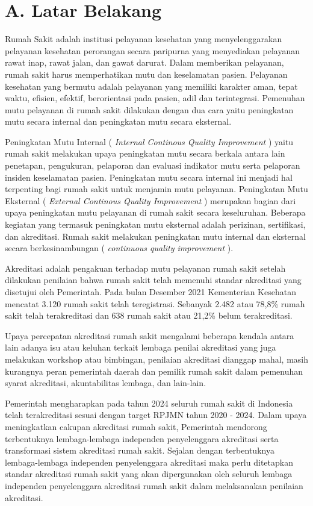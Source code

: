 \documentclass[
]{book}
\begin{document}
\hypertarget{a.-latar-belakang}{%
\section*{A. Latar Belakang}\label{a.-latar-belakang}}

Rumah Sakit adalah institusi pelayanan kesehatan yang menyelenggarakan pelayanan kesehatan perorangan secara paripurna yang menyediakan pelayanan rawat inap, rawat jalan, dan gawat darurat. Dalam memberikan pelayanan, rumah sakit harus memperhatikan mutu dan keselamatan pasien. Pelayanan kesehatan yang bermutu adalah pelayanan yang memiliki karakter aman, tepat waktu, efisien, efektif, berorientasi pada pasien, adil dan terintegrasi. Pemenuhan mutu pelayanan di rumah sakit dilakukan dengan dua cara yaitu peningkatan mutu secara internal dan peningkatan mutu secara eksternal.

Peningkatan Mutu Internal ( \emph{Internal Continous Quality Improvement} ) yaitu rumah sakit melakukan upaya peningkatan mutu secara berkala antara lain penetapan, pengukuran, pelaporan dan evaluasi indikator mutu serta pelaporan insiden keselamatan pasien. Peningkatan mutu secara internal ini menjadi hal terpenting bagi rumah sakit untuk menjamin mutu pelayanan. Peningkatan Mutu Eksternal ( \emph{External Continous Quality Improvement} ) merupakan bagian dari upaya peningkatan mutu pelayanan di rumah sakit secara keseluruhan. Beberapa kegiatan yang termasuk peningkatan mutu eksternal adalah perizinan, sertifikasi, dan akreditasi. Rumah sakit melakukan peningkatan mutu internal dan eksternal secara berkesinambungan ( \emph{continuous quality improvement} ).

Akreditasi adalah pengakuan terhadap mutu pelayanan rumah sakit setelah dilakukan penilaian bahwa rumah sakit telah memenuhi standar akreditasi yang disetujui oleh Pemerintah. Pada bulan Desember 2021 Kementerian Kesehatan mencatat 3.120 rumah sakit telah teregistrasi. Sebanyak 2.482 atau 78,8\% rumah sakit telah terakreditasi dan 638 rumah sakit atau 21,2\% belum terakreditasi.

Upaya percepatan akreditasi rumah sakit mengalami beberapa kendala antara lain adanya isu atau keluhan terkait lembaga penilai akreditasi yang juga melakukan workshop atau bimbingan, penilaian akreditasi dianggap mahal, masih kurangnya peran pemerintah daerah dan pemilik rumah sakit dalam pemenuhan syarat akreditasi, akuntabilitas lembaga, dan lain-lain.

Pemerintah mengharapkan pada tahun 2024 seluruh rumah sakit di Indonesia telah terakreditasi sesuai dengan target RPJMN tahun 2020 - 2024. Dalam upaya meningkatkan cakupan akreditasi rumah sakit, Pemerintah mendorong terbentuknya lembaga-lembaga independen penyelenggara akreditasi serta transformasi sistem akreditasi rumah sakit. Sejalan dengan terbentuknya lembaga-lembaga independen penyelenggara akreditasi maka perlu ditetapkan standar akreditasi rumah sakit yang akan dipergunakan oleh seluruh lembaga independen penyelenggara akreditasi rumah sakit dalam melaksanakan penilaian akreditasi.
\end{document}
